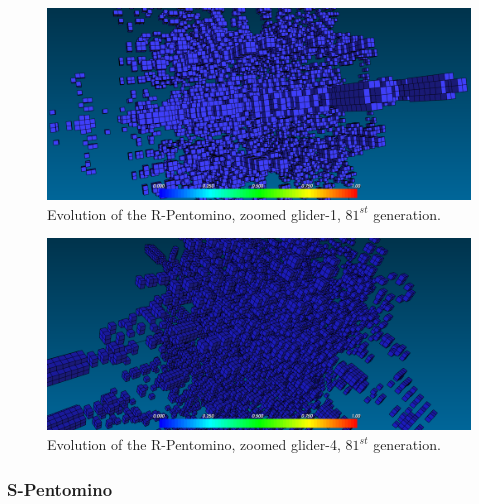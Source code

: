 \begin{figure}[H]
	\centering
	\includegraphics[scale=0.3]{pentominoes_ss/r_81_glider1.png}
	\caption{Evolution of the R-Pentomino, zoomed glider-1, $81^{st}$ generation.}
  \label{fig:ss-pent:r-81-glider1}
\end{figure}

\begin{figure}[H]
	\centering
	\includegraphics[scale=0.3]{pentominoes_ss/r_81_glider4.png}
	\caption{Evolution of the R-Pentomino, zoomed glider-4, $81^{st}$ generation.}
  \label{fig:ss-pent:r-81-glider4}
\end{figure}

\subsubsection{S-Pentomino}
\label{sec:s-pentomino}

